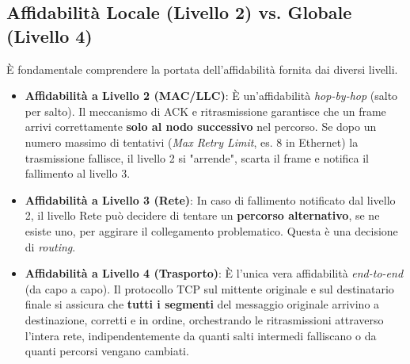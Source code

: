 \subsection{Affidabilità Locale (Livello 2) vs. Globale (Livello 4)}
È fondamentale comprendere la portata dell'affidabilità fornita dai diversi livelli.
\begin{itemize}
    \item \textbf{Affidabilità a Livello 2 (MAC/LLC)}: È un'affidabilità \textit{hop-by-hop} (salto per salto). Il meccanismo di ACK e ritrasmissione garantisce che un frame arrivi correttamente \textbf{solo al nodo successivo} nel percorso. Se dopo un numero massimo di tentativi (\textit{Max Retry Limit}, es. 8 in Ethernet) la trasmissione fallisce, il livello 2 si "arrende", scarta il frame e notifica il fallimento al livello 3.
    \item \textbf{Affidabilità a Livello 3 (Rete)}: In caso di fallimento notificato dal livello 2, il livello Rete può decidere di tentare un \textbf{percorso alternativo}, se ne esiste uno, per aggirare il collegamento problematico. Questa è una decisione di \textit{routing}.
    \item \textbf{Affidabilità a Livello 4 (Trasporto)}: È l'unica vera affidabilità \textit{end-to-end} (da capo a capo). Il protocollo TCP sul mittente originale e sul destinatario finale si assicura che \textbf{tutti i segmenti} del messaggio originale arrivino a destinazione, corretti e in ordine, orchestrando le ritrasmissioni attraverso l'intera rete, indipendentemente da quanti salti intermedi falliscano o da quanti percorsi vengano cambiati.
\end{itemize}

